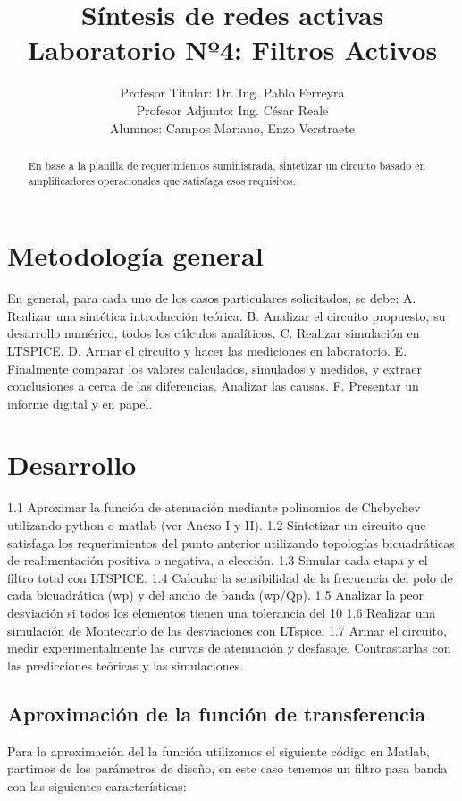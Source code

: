 \documentclass[12pt]{article}
\title{Síntesis de redes activas \\ Laboratorio Nº4: Filtros Activos}
\author{Profesor Titular: Dr. Ing. Pablo Ferreyra \\  Profesor Adjunto: Ing. César Reale \\ Alumnos: Campos Mariano, 
	Enzo Verstraete}
\begin{document}
	\maketitle
	
	\begin{abstract}
		En base a la planilla de requerimientos suministrada, sintetizar un circuito basado en
		amplificadores operacionales que satisfaga esos requisitos.
	\end{abstract}\newpage
	
	
	\section{Metodología general}	
	En general, para cada uno de los casos particulares solicitados, se debe:
	A. Realizar una sintética introducción teórica.
	B. Analizar el circuito propuesto, su desarrollo numérico, todos los cálculos analíticos.
	C. Realizar simulación en LTSPICE.
	D. Armar el circuito y hacer las mediciones en laboratorio.
	E. Finalmente comparar los valores calculados, simulados y medidos, y extraer conclusiones a
	cerca de las diferencias. Analizar las causas.
	F. Presentar un informe digital y en papel.
	
	\section{Desarrollo}
	1.1 Aproximar la función de atenuación mediante polinomios de Chebychev utilizando python
	o matlab (ver Anexo I y II).
	1.2 Sintetizar un circuito que satisfaga los requerimientos del punto anterior utilizando topologías
	bicuadráticas de realimentación positiva o negativa, a elección.
	1.3 Simular cada etapa y el filtro total con LTSPICE.
	1.4 Calcular la sensibilidad de la frecuencia del polo de cada bicuadrática (wp) y del ancho de
	banda (wp/Qp).
	1.5 Analizar la peor desviación si todos los elementos tienen una tolerancia del 10 %
	1.6 Realizar una simulación de Montecarlo de las desviaciones con LTspice.
	1.7 Armar el circuito, medir experimentalmente las curvas de atenuación y desfasaje. Contrastarlas
	con las predicciones teóricas y las simulaciones.
	
	\subsection{Aproximación de la función de transferencia}
	Para la aproximación del la función utilizamos el siguiente código en Matlab, partimos de los parámetros de diseño, en este caso tenemos un filtro pasa banda con las siguientes características:
\end{document}
